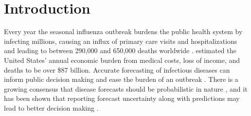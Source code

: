 \documentclass[ba]{imsart}
\theoremstyle{plain}
\theoremstyle{definition}
\theoremstyle{remark}
\begin{document}
\section{Introduction}

Every year the seasonal influenza outbreak burdens the public health system by infecting millions, causing an influx of primary care visits and hospitalizations and leading to between 290,000 and 650,000 deaths worldwide \cite[]{whoflufact2023}. \cite{molinari2007annual} estimated the United States' annual economic burden from medical costs, loss of income, and deaths to be over \$87 billion. Accurate forecasting of infectious diseases can inform public decision making and ease the burden of an outbreak \cite[]{turtle2021accurate, lutz2019applying}.
There is a growing consensus that disease forecasts should be probabilistic in nature \cite[]{gneiting2014probabilistic, bracher2021evaluating}, and it has been shown that reporting forecast uncertainty along with predictions may lead to better decision making \cite[]{ramos2013probabilistic, joslyn2012uncertainty, winkler1971probabilistic}.

\end{document}
